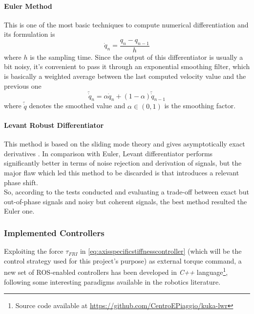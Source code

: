\paragraph{Euler Method}
This is one of the most basic techniques to compute numerical differentiation and its formulation is
\begin{equation}
\dot{q}_n = \frac{q_n - q_{n-1}}{h}
\end{equation}
where $h$ is the sampling time. Since the output of this differentiator is usually a bit noisy, it's convenient to pass it through an exponential smoothing filter, which is basically a weighted average between the last computed velocity value and the previous one
\begin{equation}
\tilde{\dot{q}}_n = \alpha\dot{q}_n + (1-\alpha)\tilde{\dot{q}}_{n-1} 
\end{equation}
where $\tilde{\dot{q}}$ denotes the smoothed value and $\alpha\in(0,1)$ is the smoothing factor.

\paragraph{Levant Robust Differentiator}
This method is based on the sliding mode theory and gives asymptotically exact derivatives \cite{levant06}. In comparison with Euler, Levant differentiator performs significantly better in terms of noise rejection and derivation of signals, but the major flaw which led this method to be discarded is that introduces a relevant phase shift.\\[1em]
So, according to the tests conducted and evaluating a trade-off between exact but out-of-phase signals and noisy but coherent signals, the best method resulted the Euler one.

\subsubsection{Implemented Controllers}\nocite{siciliano09}\nocite{bicchi13}
Exploiting the force $\tau_{FRI}$ in \eqref{eq:axisspecificstiffnesscontroller} (which will be the control strategy used for this project's purpose) as external torque command, a new set of ROS-enabled controllers has been developed in \textit{C++} language\footnote{Source code available at \url{https://github.com/CentroEPiaggio/kuka-lwr}}, following some interesting paradigms available in the robotics literature.

